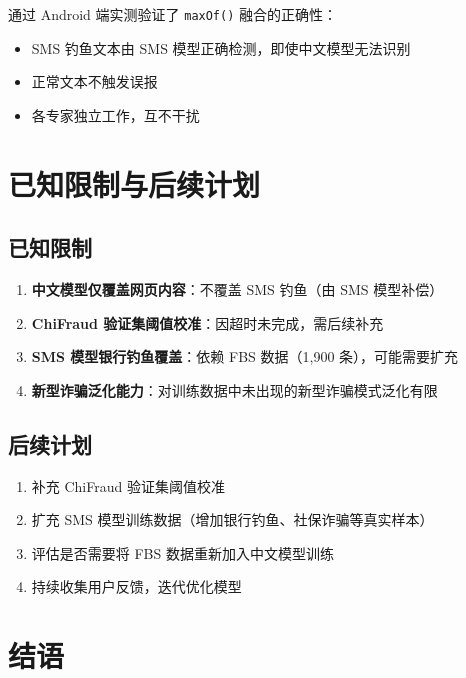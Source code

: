 \documentclass[11pt,a4paper]{article}
\begin{document}
通过 Android 端实测验证了 \texttt{maxOf()} 融合的正确性：
\begin{itemize}
  \item SMS 钓鱼文本由 SMS 模型正确检测，即使中文模型无法识别
  \item 正常文本不触发误报
  \item 各专家独立工作，互不干扰
\end{itemize}

\section{已知限制与后续计划}

\subsection{已知限制}

\begin{enumerate}
  \item \textbf{中文模型仅覆盖网页内容}：不覆盖 SMS 钓鱼（由 SMS 模型补偿）
  \item \textbf{ChiFraud 验证集阈值校准}：因超时未完成，需后续补充
  \item \textbf{SMS 模型银行钓鱼覆盖}：依赖 FBS 数据（1,900 条），可能需要扩充
  \item \textbf{新型诈骗泛化能力}：对训练数据中未出现的新型诈骗模式泛化有限
\end{enumerate}

\subsection{后续计划}

\begin{enumerate}
  \item 补充 ChiFraud 验证集阈值校准
  \item 扩充 SMS 模型训练数据（增加银行钓鱼、社保诈骗等真实样本）
  \item 评估是否需要将 FBS 数据重新加入中文模型训练
  \item 持续收集用户反馈，迭代优化模型
\end{enumerate}

\section{结语}
\end{document}
